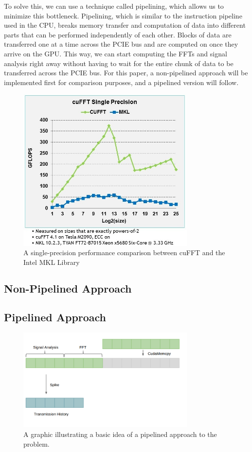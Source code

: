 \documentclass[conference]{IEEEtran}
\begin{document}
To solve this, we can use a technique called pipelining, which allows us to
minimize this bottleneck. Pipelining, which is similar to the instruction
pipeline used in the CPU, breaks memory transfer and computation of data into different
parts that can be performed independently of each other. Blocks of data are transferred
one at a time across the PCIE bus and are computed on once they arrive on the GPU.
This way, we can start computing the FFTs and signal analysis right away without
having to wait for the entire chunk of data to be transferred across the PCIE
bus. For this paper, a non-pipelined approach will be implemented first for
comparison purposes, and a pipelined version will follow.

\begin{figure}[ht!]
\centering
\includegraphics[width=3.5in]{cufftperformance.jpg}
\caption{A single-precision performance comparison between cuFFT and the Intel MKL Library \cite{nvidia:cufft}}
\label{fig:cufftmklperformance}
\end{figure}

\subsection{Non-Pipelined Approach}

\subsection{Pipelined Approach}

\begin{figure}[ht!]
\centering
\includegraphics[width=3.5in]{parallelgraphic.png}
\caption{A graphic illustrating a basic idea of a pipelined approach to the problem.}
\label{fig:pipeline}
\end{figure}
\end{document}
